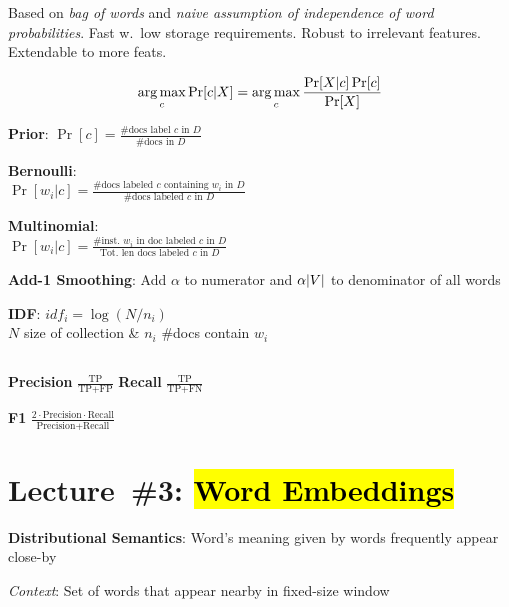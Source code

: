 \documentclass[9pt]{extarticle}
\renewcommand{\green}[1]{{\color{ForestGreen} #1}}
\newcommand{\greenbf}[1]{\textbf{\green{#1}}}
\begin{document}
\begin{multicols}{3}
  Based on \textit{bag of words} and \textit{naive assumption of independence of word probabilities}. Fast w.\ low storage requirements. Robust to irrelevant features. Extendable to more feats.

  \begin{equation*}\label{eq:L02:NaiveBayes}
    \operatorname*{arg\,max}_c \Pr\lbrack c \vert X\rbrack = \operatorname*{arg\,max}_{c} \frac{\Pr[X \vert c] \Pr[c]}{\Pr[X]}
  \end{equation*}

  \greenbf{Prior}: $\Pr[c] = \frac{\text{\#docs label } c \text{ in } D}{\text{\#docs in } D}$

  \greenbf{Bernoulli}: \\ $\Pr[w_ i \vert c] = \frac{\text{\# docs labeled } c \text{ containing } w_i \text{ in } D}{\text{\#docs labeled } c \text{ in } D}$

  \greenbf{Multinomial}: \\ $\Pr[w_i \vert c] = \frac{\text{\# inst.\ } w_i \text{ in doc labeled } c \text{ in } D}{\text{Tot.\ len docs labeled } c \text{ in } D}$

  \greenbf{Add-1 Smoothing}: Add $\alpha$ to numerator and $\alpha\lvert V\rvert$ to denominator of all words

  \greenbf{IDF}: $idf_i = \log \left(N/n_i\right)$ \\ $N$ size of collection \& $n_i$ \#docs contain $w_i$

  \subsection*{}

  \greenbf{Precision} $\frac{\text{TP}}{\text{TP} + \text{FP}}$ \hspace{0.1cm} \greenbf{Recall} $\frac{\text{TP}}{\text{TP} + \text{FN}}$

  \greenbf{F1} $\frac{2 \cdot \text{Precision} \cdot \text{Recall}}{\text{Precision} + \text{Recall}}$

  \section*{Lecture~\#3: \hl{Word Embeddings}}
  \greenbf{Distributional Semantics}: Word's meaning given by words frequently appear close-by

  \textit{Context}: Set of words that appear nearby in fixed-size window

  \subsection*{}


\end{multicols}
\end{document}
